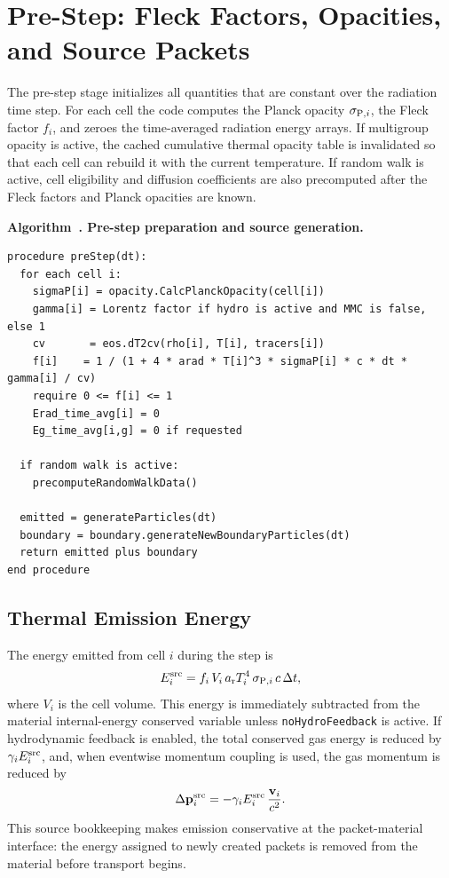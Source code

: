\documentclass[11pt]{article}
\newcounter{algorithm}
\newcommand{\AlgorithmCaption}[2]{%
  \refstepcounter{algorithm}%
  \label{#1}%
  \par\medskip\noindent\textbf{Algorithm~\thealgorithm. #2}\par\nobreak\smallskip%
}
\newcommand{\clight}{c}
\newcommand{\arad}{a_{\rm r}}
\newcommand{\dt}{\Delta t}
\newcommand{\vcell}{\mathbf{v}}
\newcommand{\mom}{\mathbf{p}}
\begin{document}
\section{Pre-Step: Fleck Factors, Opacities, and Source Packets}

The pre-step stage initializes all quantities that are constant over the
radiation time step. For each cell the code computes the Planck opacity
\(\sigma_{{\rm P},i}\), the Fleck factor \(f_i\), and zeroes the time-averaged radiation
energy arrays. If multigroup opacity is active, the cached cumulative thermal
opacity table is invalidated so that each cell can rebuild it with the current
temperature. If random walk is active, cell eligibility and diffusion
coefficients are also precomputed after the Fleck factors and Planck opacities
are known.

\AlgorithmCaption{alg:prestep}{Pre-step preparation and source generation.}
\begin{verbatim}
procedure preStep(dt):
  for each cell i:
    sigmaP[i] = opacity.CalcPlanckOpacity(cell[i])
    gamma[i] = Lorentz factor if hydro is active and MMC is false, else 1
    cv       = eos.dT2cv(rho[i], T[i], tracers[i])
    f[i]    = 1 / (1 + 4 * arad * T[i]^3 * sigmaP[i] * c * dt * gamma[i] / cv)
    require 0 <= f[i] <= 1
    Erad_time_avg[i] = 0
    Eg_time_avg[i,g] = 0 if requested

  if random walk is active:
    precomputeRandomWalkData()

  emitted = generateParticles(dt)
  boundary = boundary.generateNewBoundaryParticles(dt)
  return emitted plus boundary
end procedure
\end{verbatim}

\subsection{Thermal Emission Energy}

The energy emitted from cell \(i\) during the step is
\begin{equation}
  E^{\rm src}_i
  =
  f_i\,V_i\,\arad T_i^4\,\sigma_{{\rm P},i}\,\clight\,\dt,
  \label{eq:source-energy}
\end{equation}
where \(V_i\) is the cell volume. This energy is immediately subtracted from
the material internal-energy conserved variable unless \texttt{noHydroFeedback}
is active. If hydrodynamic feedback is enabled, the total conserved gas energy
is reduced by \(\gamma_i E^{\rm src}_i\), and, when eventwise momentum coupling
is used, the gas momentum is reduced by
\begin{equation}
  \Delta \mom_i^{\rm src}
  =
  -\gamma_i E^{\rm src}_i\,\frac{\vcell_i}{c^2}.
\end{equation}
This source bookkeeping makes emission conservative at the packet-material
interface: the energy assigned to newly created packets is removed from the
material before transport begins.
\end{document}
